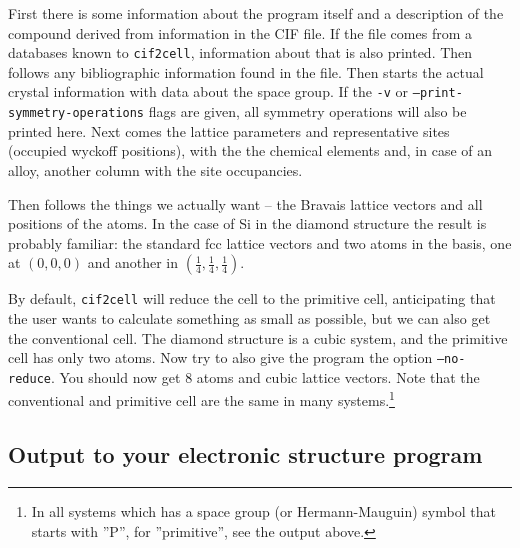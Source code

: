 \documentclass[11pt]{article}
\newcommand{\ciftocell}{\texttt{cif2cell}}
\begin{document}
\newpage
First there is some information about the program itself and a description of the compound derived from information in the CIF file. If the file comes from a databases known to \ciftocell, information about that is also printed. Then follows any bibliographic information found in the file. Then starts the actual crystal information with data about the space group. If the \texttt{-v} or \texttt{--print-symmetry-operations} flags are given, all symmetry operations will also be printed here. Next comes the lattice parameters and representative sites (occupied wyckoff positions), with the the chemical elements and, in case of an alloy, another column with the site occupancies.

Then follows the things we actually want -- the Bravais lattice vectors and all positions of the atoms.  In the case of Si in the diamond structure the result is probably familiar:  the standard fcc lattice vectors and two atoms in the basis, one at $(0,0,0)$ and another in $(\frac{1}{4},\frac{1}{4},\frac{1}{4})$. 

By default, \ciftocell{} will reduce the cell to the primitive cell, anticipating that the user wants to calculate something as small as possible, but we can also get the conventional cell. The diamond structure is a cubic system, and the primitive cell has only two atoms. Now try to also give the program the option \texttt{--no-reduce}. You should now get 8 atoms and cubic lattice vectors. Note that the conventional and primitive cell are the same in many systems.\footnote{In all systems which has a space group (or Hermann-Mauguin) symbol that starts with ''P'', for ''primitive'', see the output above.}

\subsection{Output to your electronic structure program}
\end{document}
